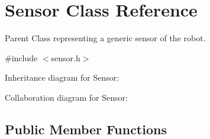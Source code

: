 \hypertarget{classSensor}{}\section{Sensor Class Reference}
\label{classSensor}


Parent Class representing a generic sensor of the robot.  




{\ttfamily \#include $<$sensor.\+h$>$}



Inheritance diagram for Sensor\+:


Collaboration diagram for Sensor\+:
\subsection*{Public Member Functions}
